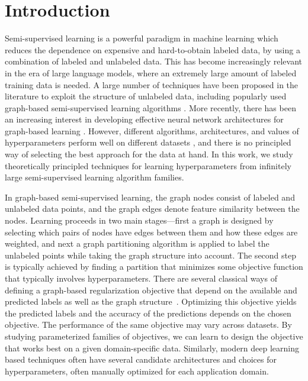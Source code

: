 \section{Introduction}
Semi-supervised learning is a powerful paradigm in machine learning which reduces the dependence on expensive and hard-to-obtain labeled data, by using a combination of labeled and unlabeled data. This has become increasingly relevant in the era of large language models, where an extremely large amount of labeled training data is needed. A large number of techniques have been proposed in the literature to exploit the structure of unlabeled data, including popularly used graph-based semi-supervised learning algorithms \citep{blum1998combining,zhu2003semi,zhou2003learning,delalleau2005efficient,chapelle2009semi}. More recently, there has been an increasing interest in developing effective neural network architectures for graph-based learning \citep{kipf2016semi,velivckovic2017graph,iscen2019label}. However, different algorithms, architectures, and values of hyperparameters perform well on different datasets \citep{dwivedi2023benchmarking}, and there is no principled way of selecting the best approach for the data at hand. In this work, we  study  theoretically principled techniques for learning hyperparameters from infinitely large semi-supervised learning algorithm families.

In graph-based semi-supervised learning, the graph nodes consist of labeled and unlabeled data points, and the graph edges denote feature similarity between the nodes. Learning proceeds in two main stages---first a graph is designed by selecting which pairs of nodes have edges between them and how these edges are weighted, and next a graph partitioning algorithm is applied to label the unlabeled points while taking the graph structure into account. The second step is typically achieved by finding a partition that minimizes some objective function that typically involves hyperparameters. There are several classical ways of defining a graph-based regularization objective that depend on the available and predicted labels as well as the graph structure~\citep{zhou2003learning,delalleau2005efficient}. Optimizing this objective yields the predicted labels and the accuracy of the predictions depends on the chosen objective. The performance of the same objective may vary across datasets. By studying parameterized families of objectives, we can learn to design the objective that works best on a given domain-specific data. Similarly, modern deep learning based techniques often have several candidate architectures and choices for hyperparameters, often manually optimized for each application domain.

